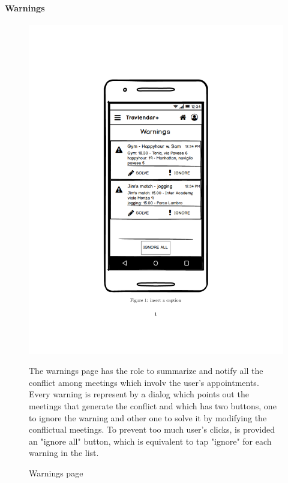 \paragraph{Warnings}
	\begin{figure}
		\centering
		\includegraphics[width=0.6\linewidth]{mockups/Warnings}
		\caption{Warnings page}
		\label{fig:warnings}
		\begin{center}
			The warnings page has the role to summarize and notify all the conflict among meetings which involv the user's appointments. Every warning is represent by a dialog which points out the meetings that generate the conflict and which has two buttons, one to ignore the warning and other one to solve it by modifying the conflictual meetings. 
			To prevent too much user's clicks, is provided an "ignore all" button, which is equivalent to tap "ignore" for each warning in the list. 
		\end{center}
	\end{figure}
\clearpage
